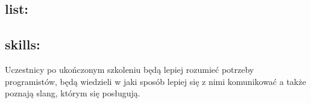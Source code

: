 \documentclass{article}[10pt]
\begin{document}
	\subsection*{list:}
\begin{adjustwidth}{1.5cm}{}
	\begin{itemize}













	\end{itemize}
\end{adjustwidth}

	\subsection*{skills:}
\begin{adjustwidth}{2cm}{}
	
Uczestnicy po ukończonym szkoleniu będą lepiej rozumieć potrzeby programistów, będą wiedzieli w jaki sposób lepiej się z nimi komunikować a także poznają slang, którym się posługują. 
\end{adjustwidth}

\newpage
\end{document}
